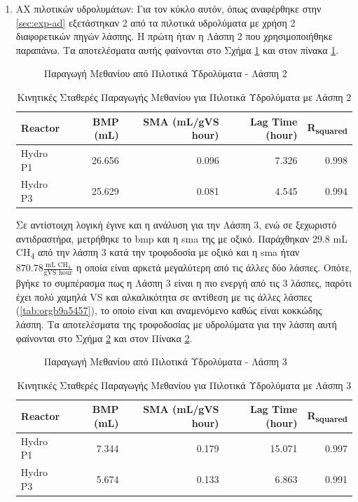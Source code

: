 \documentclass[11pt]{report}
\begin{document}
\begin{enumerate}
\item AX πιλοτικών υδρολυμάτων:
\label{sec:orgf4cbb4b}
Για τον κύκλο αυτόν, όπως αναφέρθηκε στην \autoref{sec:exp-ad} εξετάστηκαν 2 από τα πιλοτικά υδρολύματα με χρήση 2 διαφορετικών πηγών λάσπης. Η πρώτη ήταν η Λάσπη 2 που χρησιμοποιήθηκε παραπάνω. Τα αποτελέσματα αυτής φαίνονται στο Σχήμα \ref{fig:org00f0816} και στον πίνακα \ref{tab:orgf63bbd0}.

\begin{figure}[htbp]
\centering

\caption{\label{fig:org00f0816}Παραγωγή Μεθανίου από Πιλοτικά Υδρολύματα - Λάσπη 2}
\end{figure}

\begin{table}[htbp]
\caption{\label{tab:orgf63bbd0}Κινητικές Σταθερές Παραγωγής Μεθανίου για Πιλοτικά Υδρολύματα με Λάσπη 2}
\centering
\begin{tabular}{lrrrr}
Reactor & BMP (mL) & SMA (mL/gVS hour) & Lag Time (hour) & R\textsubscript{squared}\\[0pt]
\hline
Hydro P1 & 26.656 & 0.096 & 7.326 & 0.998\\[0pt]
Hydro P3 & 25.629 & 0.081 & 4.545 & 0.994\\[0pt]
\end{tabular}
\end{table}

Σε αντίστοιχη λογική έγινε και η ανάλυση για την Λάσπη 3, ενώ σε ξεχωριστό αντιδραστήρα, μετρήθηκε το \acrshort{bmp} και η \acrshort{sma} της με οξικό. Παράχθηκαν 29.8 mL CH\textsubscript{4} από την λάσπη 3 κατά την τροφοδοσία με οξικό και η \acrshort{sma} ήταν \(870.78 \frac{\text{mL CH$_4$}}{\text{gVS hour}}\) η οποία είναι αρκετά μεγαλύτερη από τις άλλες δύο λάσπες. Οπότε, βγήκε το συμπέρασμα πως η Λάσπη 3 είναι η πιο ενεργή από τις 3 λάσπες, παρότι έχει πολύ χαμηλά VS και αλκαλικότητα σε αντίθεση με τις άλλες λάσπες (\ref{tab:orgb9a5457}), το οποίο είναι και αναμενόμενο καθώς είναι κοκκώδης λάσπη. Τα αποτελέσματα της τροφοδοσίας με υδρολύματα για την λάσπη αυτή φαίνονται στο Σχήμα \ref{fig:org8efa632} και στον Πίνακα \ref{tab:org5a91259}.

\begin{figure}[htbp]
\centering

\caption{\label{fig:org8efa632}Παραγωγή Μεθανίου από Πιλοτικά Υδρολύματα - Λάσπη 3}
\end{figure}

\begin{table}[htbp]
\caption{\label{tab:org5a91259}Κινητικές Σταθερές Παραγωγής Μεθανίου για Πιλοτικά Υδρολύματα με Λάσπη 3}
\centering
\begin{tabular}{lrrrr}
Reactor & BMP (mL) & SMA (mL/gVS hour) & Lag Time (hour) & R\textsubscript{squared}\\[0pt]
\hline
Hydro P1 & 7.344 & 0.179 & 15.071 & 0.997\\[0pt]
Hydro P3 & 5.674 & 0.133 & 6.863 & 0.991\\[0pt]
\end{tabular}
\end{table}


\end{enumerate}
\end{document}
